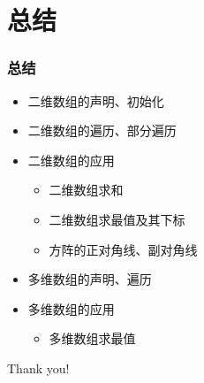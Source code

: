 \section{总结}

\begin{frame}[fragile]
    \frametitle{总结}

    \begin{itemize}
        \item<1-> 二维数组的声明、初始化
        \item<1-> 二维数组的遍历、部分遍历
        \item<1-> 二维数组的应用
            \begin{itemize}
                \item<1-> 二维数组求和
                \item<1-> 二维数组求最值及其下标
                \item<1-> 方阵的正对角线、副对角线
            \end{itemize}
        \item<2-> 多维数组的声明、遍历
        \item<2-> 多维数组的应用
            \begin{itemize}
                \item<2-> 多维数组求最值
            \end{itemize}
    \end{itemize}
\end{frame}

\begin{frame}
    \begin{center}
        {\Huge Thank you!}
    \end{center}
\end{frame}


